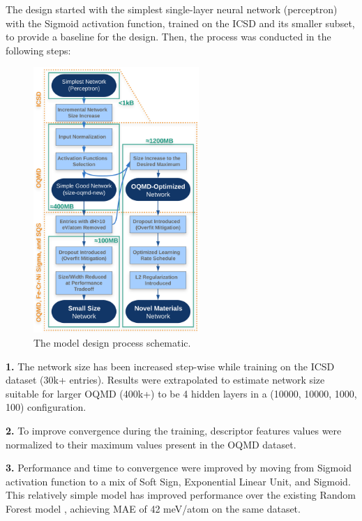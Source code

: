 The design started with the simplest single-layer neural network (perceptron) with the Sigmoid activation function, trained on the ICSD and its smaller subset, to provide a baseline for the design. Then, the process was conducted in the following steps:

    \begin{figure}[H]
    \centering
    \includegraphics[width=0.56\textwidth]{sipfenn/SIPFENN_design_updated.png}
    \caption{The model design process schematic.}
    \label{sipfenn:fig:designprocess}
    \end{figure}

\textbf{1. }The network size has been increased step-wise while training on the ICSD dataset (30k+ entries). Results were extrapolated to estimate network size suitable for larger OQMD (400k+) to be 4 hidden layers in a (10000, 10000, 1000, 100) configuration.

\textbf{2. }To improve convergence during the training, descriptor features values were normalized to their maximum values present in the OQMD dataset.

\textbf{3. }Performance and time to convergence were improved by moving from Sigmoid activation function to a mix of Soft Sign, Exponential Linear Unit, and Sigmoid. This relatively simple model has improved performance over the existing Random Forest model \cite{Ward2017IncludingTessellations}, achieving MAE of 42 meV/atom on the same dataset.

